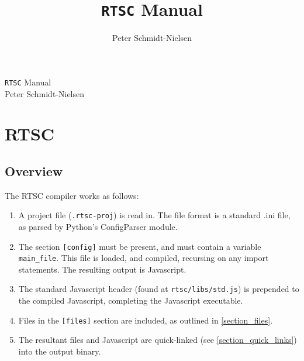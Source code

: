 \documentclass[10pt]{book}
\title{\texttt{RTSC} Manual}
\author{Peter Schmidt-Nielsen}
\begin{document}
\frontmatter
\thispagestyle{empty}
\begin{center}
\vspace*{5cm}
{\Huge \texttt{RTSC} Manual} \\
\vspace{2cm}
{\Large Peter Schmidt-Nielsen}
\end{center}
\tableofcontents
\chapter{RTSC}
\section{Overview}
The RTSC compiler works as follows:
\begin{enumerate}
\item
A project file (\texttt{.rtsc-proj}) is read in.
The file format is a standard .ini file, as parsed by Python's ConfigParser module.
\item
The section \texttt{[config]} must be present, and must contain a variable \texttt{main\_file}.
This file is loaded, and compiled, recursing on any import statements.
The resulting output is Javascript.
\item
The standard Javascript header (found at \texttt{rtsc/libs/std.js}) is prepended to the compiled Javascript, completing the Javascript executable.
\item
Files in the \texttt{[files]} section are included, as outlined in \ref{section_files}.
\item
The resultant files and Javascript are quick-linked (see \ref{section_quick_links}) into the output binary.
\end{enumerate}
\end{document}
